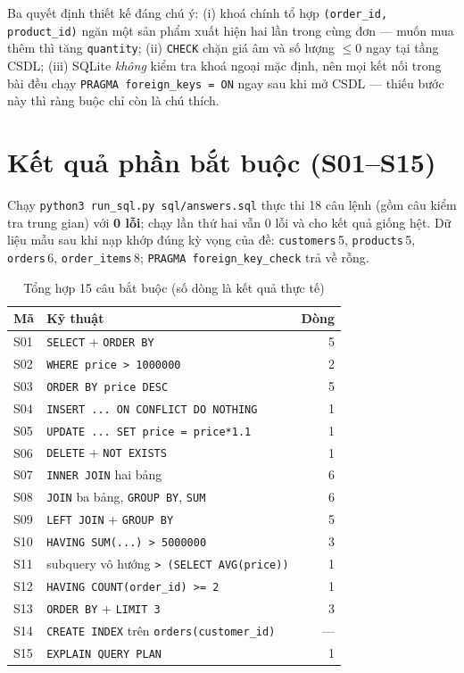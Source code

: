 \documentclass[10pt,a4paper,twocolumn]{article}
\newcommand{\code}[1]{\texttt{\small #1}}
\begin{document}
Ba quyết định thiết kế đáng chú ý: (i) khoá chính tổ hợp \code{(order\_id, product\_id)} ngăn một
sản phẩm xuất hiện hai lần trong cùng đơn --- muốn mua thêm thì tăng \code{quantity};
(ii) \code{CHECK} chặn giá âm và số lượng $\leq 0$ ngay tại tầng CSDL;
(iii) SQLite \emph{không} kiểm tra khoá ngoại mặc định, nên mọi kết nối trong bài đều chạy
\code{PRAGMA foreign\_keys = ON} ngay sau khi mở CSDL --- thiếu bước này thì ràng buộc chỉ còn là
chú thích.

\section{Kết quả phần bắt buộc (S01--S15)}

Chạy \code{python3 run\_sql.py sql/answers.sql} thực thi 18 câu lệnh (gồm câu kiểm tra trung
gian) với \textbf{0 lỗi}; chạy lần thứ hai vẫn 0 lỗi và cho kết quả giống hệt. Dữ liệu mẫu sau
khi nạp khớp đúng kỳ vọng của đề: \code{customers}\,5, \code{products}\,5, \code{orders}\,6,
\code{order\_items}\,8; \code{PRAGMA foreign\_key\_check} trả về rỗng.

\begin{table}[H]
\centering
\caption{Tổng hợp 15 câu bắt buộc (số dòng là kết quả thực tế)}
\label{tab:s01s15}
\scriptsize
\begin{tabularx}{\linewidth}{@{}l X r@{}}
\toprule
\textbf{Mã} & \textbf{Kỹ thuật} & \textbf{Dòng} \\
\midrule
S01 & \code{SELECT} + \code{ORDER BY} & 5 \\
S02 & \code{WHERE price > 1000000} & 2 \\
S03 & \code{ORDER BY price DESC} & 5 \\
S04 & \code{INSERT ... ON CONFLICT DO NOTHING} & 1 \\
S05 & \code{UPDATE ... SET price = price*1.1} & 1 \\
S06 & \code{DELETE} + \code{NOT EXISTS} & 1 \\
S07 & \code{INNER JOIN} hai bảng & 6 \\
S08 & \code{JOIN} ba bảng, \code{GROUP BY}, \code{SUM} & 6 \\
S09 & \code{LEFT JOIN} + \code{GROUP BY} & 5 \\
S10 & \code{HAVING SUM(...) > 5000000} & 3 \\
S11 & subquery vô hướng \code{> (SELECT AVG(price))} & 1 \\
S12 & \code{HAVING COUNT(order\_id) >= 2} & 1 \\
S13 & \code{ORDER BY} + \code{LIMIT 3} & 3 \\
S14 & \code{CREATE INDEX} trên \code{orders(customer\_id)} & --- \\
S15 & \code{EXPLAIN QUERY PLAN} & 1 \\
\bottomrule
\end{tabularx}
\end{table}
\end{document}
